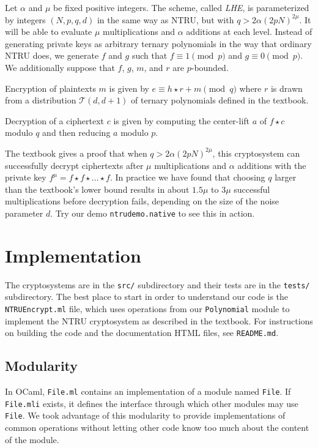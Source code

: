 \documentclass[10pt]{article}
\begin{document}
Let $\alpha$ and $\mu$ be fixed positive integers. The scheme, called
\emph{LHE}, is parameterized by integers $(N, p, q, d)$ in the same way as NTRU,
but with \(q > 2\alpha(2pN)^{2\mu}\). It will be able to evaluate \(\mu\)
multiplications and \(\alpha\) additions at each level. Instead of generating
private keys as arbitrary ternary polynomials in the way that ordinary NTRU
does, we generate \(f\) and \(g\) such that \(f \equiv 1 \pmod{p}\) and \(g
\equiv 0 \pmod{p}\). We additionally suppose that \(f\), \(g\), \(m\), and \(r\)
are \(p\)-bounded.

Encryption of plaintexts $m$ is given by \(e \equiv h \star r + m \pmod{q}\)
where \(r\) is drawn from a distribution \(\mathcal{T}(d, d+1)\) of ternary
polynomials defined in the textbook.

Decryption of a ciphertext $c$ is given by computing the center-lift $a$
of $f \star c$ modulo $q$ and then reducing $a$ modulo $p$.

The textbook gives a proof that when \(q > 2\alpha(2pN)^{2\mu}\), this
cryptosystem can successfully decrypt ciphertexts after $\mu$ multiplications
and $\alpha$ additions with the private key $f^\mu = f \star f \star \dots \star
f$. In practice we have found that choosing \(q\) larger than the textbook's
lower bound results in about \(1.5\mu\) to \(3\mu\) successful multiplications
before decryption fails, depending on the size of the noise parameter \(d\). Try
our demo \texttt{ntrudemo.native} to see this in action.

\section{Implementation}
The cryptosystems are in the \texttt{src/} subdirectory and their tests are in
the \texttt{tests/} subdirectory. The best place to start in order to understand
our code is the \texttt{NTRUEncrypt.ml} file, which uses operations from our
\texttt{Polynomial} module to implement the NTRU cryptosystem as described in
the textbook. For instructions on building the code and the documentation HTML
files, see \texttt{README.md}.

\subsection{Modularity}
In OCaml, \texttt{File.ml} contains an implementation of a module named
\texttt{File}. If \texttt{File.mli} exists, it defines the interface through
which other modules may use \texttt{File}. We took advantage of this modularity
to provide implementations of common operations without letting other code know
too much about the content of the module.
\end{document}
